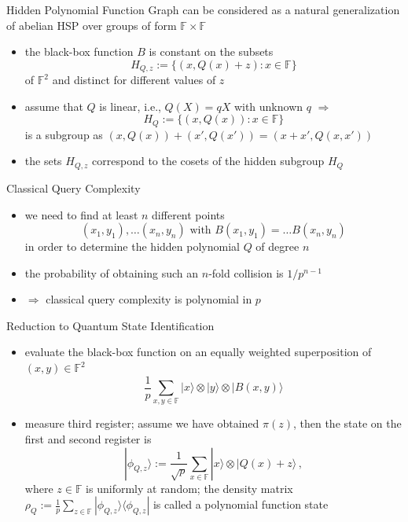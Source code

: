 \documentclass[slideColor]{prosper}
\newcommand{\F}{{\mathbb{F}}}
\renewcommand{\>}{\rangle}
\newcommand{\<}{\langle}
\begin{document}

\begin{slide}{Hidden Polynomial Function Graph}
can be considered as a natural generalization of abelian HSP over groups of form $\F\times\F$
\begin{itemize}
\item the black-box function $B$ is constant on the subsets
\[
H_{Q,z}:=\{(x,Q(x)+z) : x \in \F\}
\]
of $\F^2$ and distinct for different values of $z$
\item assume that $Q$ is linear, i.e., $Q(X)=q X$ with unknown $q$ $\Rightarrow$
\[
H_{Q}:=\{(x,Q(x)) : x\in\F\}
\] 
is a subgroup as $(x,Q(x))+(x',Q(x'))=(x+x',Q(x,x'))$
\item the sets $H_{Q,z}$ correspond to the cosets of the hidden subgroup $H_Q$
\end{itemize}
\end{slide}


\begin{slide}{Classical Query Complexity}
\begin{itemize}
\item we need to find at least $n$ different points 
\[
(x_1,y_1), \ldots (x_n,y_n) \mbox{ with } B(x_1,y_1)=\ldots B(x_n,y_n)
\]
in order to determine the hidden polynomial $Q$ of degree $n$
\item the probability of obtaining such an $n$-fold collision is $1/p^{n-1}$
\item $\Rightarrow$ classical query complexity is polynomial in $p$
\end{itemize}
\end{slide}


\begin{slide}{Reduction to Quantum State Identification}
\begin{itemize}
\item evaluate the black-box function on an equally weighted superposition of $(x,y)\in\F^2$
\[
\frac{1}{p} \sum_{x,y\in\F} |x\> \otimes |y\> \otimes |B(x,y)\>
\]
\item measure third register; assume we have obtained $\pi(z)$, then the state on the first and second register is
\[
|\phi_{Q,z}\> := \frac{1}{\sqrt{p}}\sum_{x\in\F} |x\> \otimes |Q(x)+z\>\,,
\]
where $z\in\F$ is uniformly at random; the density matrix $\rho_Q := \frac{1}{p}\sum_{z\in\F} |\phi_{Q,z}\>\<\phi_{Q,z}|$ is called a polynomial function state
\end{itemize}
\end{slide}
\end{document}
